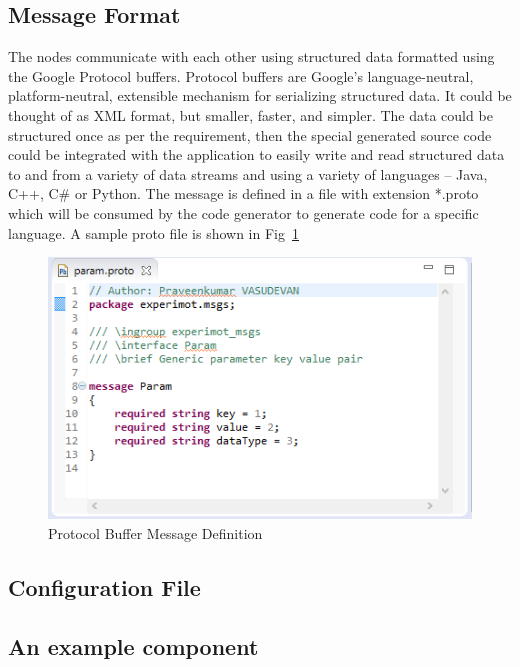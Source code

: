 \subsection{Message Format}
	The nodes communicate with each other using structured data formatted using the Google Protocol buffers\cite{ProtocolBuffers}. Protocol buffers are Google's language-neutral, platform-neutral, extensible mechanism for serializing structured data. It could be thought of as XML format, but smaller, faster, and simpler. The data could be structured once as per the requirement, then the special generated source code could be integrated with the application to easily write and read structured data to and from a variety of data streams and using a variety of languages – Java, C++, C\# or Python. The message is defined in a file with extension *.proto which will be consumed by the code generator to generate code for a specific language. A sample proto file is shown in Fig~\ref{fig:protobuf_def}
\begin{figure}
\centering
\includegraphics[width=\textwidth]{assets/protobuf_format.png}
\caption[Protocol Buffer Message Definition]{Protocol Buffer Message Definition}
\label{fig:protobuf_def}
\end{figure}
\subsection{Configuration File}

\subsection{An example component}